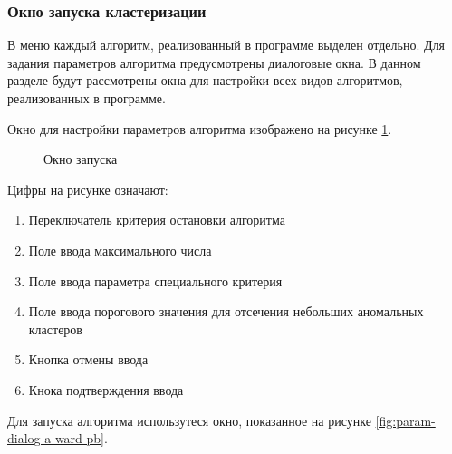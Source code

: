 \documentclass[12pt,tikz]{instruction}
\begin{document}
\subsubsection{Окно запуска кластеризации}

В меню каждый алгоритм, реализованный в программе выделен отдельно. Для задания параметров алгоритма предусмотрены диалоговые окна. В данном разделе будут рассмотрены окна для настройки всех видов алгоритмов, реализованных в программе. 

\textbf{\AWard}

Окно для настройки параметров алгоритма \AWard изображено на рисунке \ref{fig:param-dialog-a-ward}.
\begin{figure}[H]
	\centering
	\caption{Окно запуска \AWard}
	\label{fig:param-dialog-a-ward}
\end{figure}

Цифры на рисунке означают:
\begin{enumerate}
	\item Переключатель критерия остановки алгоритма
	\item Поле ввода максимального числа 
	\item Поле ввода параметра специального критерия
	\item Поле ввода порогового значения для отсечения небольших аномальных кластеров
	\item Кнопка отмены ввода
	\item Кнока подтверждения ввода
\end{enumerate}

\textbf{\AWardpb}

Для запуска алгоритма \AWardpb использутеся окно, показанное на рисунке \ref{fig:param-dialog-a-ward-pb}.
\end{document}
